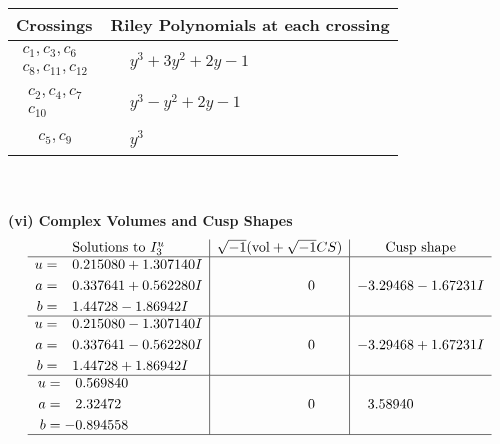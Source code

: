 \documentclass[1p]{elsarticle_modified}
\theoremstyle{definition}
\newcommand{\I}{\sqrt{-1}}
\begin{document}
\begin{tabular}{m{50pt}|m{274pt}}
Crossings & \hspace{64pt}Riley Polynomials at each crossing \\
\hline $$\begin{aligned}c_{1},c_{3},c_{6}\\c_{8},c_{11},c_{12}\end{aligned}$$&$\begin{aligned}
&y^3+3 y^2+2 y-1
\end{aligned}$\\
\hline $$\begin{aligned}c_{2},c_{4},c_{7}\\c_{10}\end{aligned}$$&$\begin{aligned}
&y^3- y^2+2 y-1
\end{aligned}$\\
\hline $$\begin{aligned}c_{5},c_{9}\end{aligned}$$&$\begin{aligned}
&y^3
\end{aligned}$\\
\hline
\end{tabular}\\~\\
\newpage\flushleft \textbf{(vi) Complex Volumes and Cusp Shapes}
$$\begin{array}{c|c|c}  
\text{Solutions to }I^u_{3}& \I (\text{vol} + \sqrt{-1}CS) & \text{Cusp shape}\\
 \hline 
\begin{aligned}
u &= \phantom{-}0.215080 + 1.307140 I \\
a &= \phantom{-}0.337641 + 0.562280 I \\
b &= \phantom{-}1.44728 - 1.86942 I\end{aligned}
 & \phantom{-0.000000 } 0 & -3.29468 - 1.67231 I \\ \hline\begin{aligned}
u &= \phantom{-}0.215080 - 1.307140 I \\
a &= \phantom{-}0.337641 - 0.562280 I \\
b &= \phantom{-}1.44728 + 1.86942 I\end{aligned}
 & \phantom{-0.000000 } 0 & -3.29468 + 1.67231 I \\ \hline\begin{aligned}
u &= \phantom{-}0.569840\phantom{ +0.000000I} \\
a &= \phantom{-}2.32472\phantom{ +0.000000I} \\
b &= -0.894558\phantom{ +0.000000I}\end{aligned}
 & \phantom{-0.000000 } 0 & \phantom{-}3.58940\phantom{ +0.000000I}\\
 \hline 
 \end{array}$$\newpage
\end{document}
